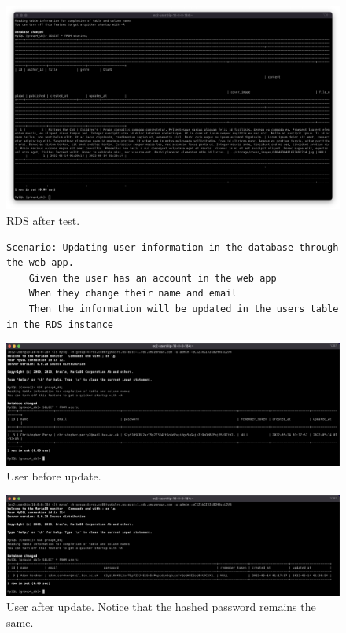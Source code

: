 \begin{figure}[!htbp]
    \centering
    \includegraphics[width=\textwidth]{resources/rds/rds-testing-stories-after}
    \caption{RDS after test.}
    \label{fig:rds-testing-story-added}
\end{figure}

\clearpage


\begin{figure}[!htbp]
    \centering
    \begin{verbatim}
Scenario: Updating user information in the database through the web app.
    Given the user has an account in the web app
    When they change their name and email
    Then the information will be updated in the users table in the RDS instance
    \end{verbatim}
    \label{fig:update-user-data}
\end{figure}

\begin{figure}[!htbp]
    \centering
    \includegraphics[width=\textwidth]{resources/rds/rds-testing-user-added}
    \caption{User before update.}
    \label{fig:rds-testing-user-before-update}
\end{figure}

\begin{figure}[!htbp]
    \centering
    \includegraphics[width=\textwidth]{resources/rds/rds-testing-update-after}
    \caption{User after update. Notice that the hashed password remains the same.}
    \label{fig:rds-testing-user-after-update}
\end{figure}

